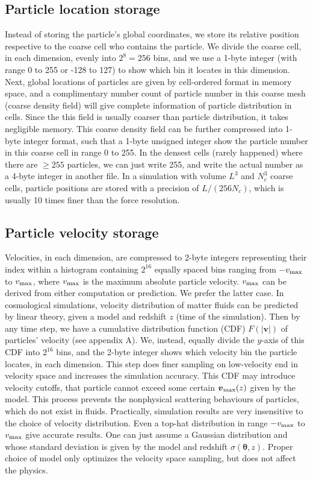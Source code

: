 \documentclass[10pt,twocolumn,preprint]{emulateapj}
\newcommand{\bs}{\boldsymbol}
\begin{document}
\subsection{Particle location storage}
Instead of storing the particle's global coordinates, we store its relative position respective to the coarse cell who contains the particle. We divide the coarse cell, in each dimension, evenly into $2^8=256$ bins, and we use a 1-byte integer (with range 0 to 255 or -128 to 127) to show which bin it locates in this dimension. Next, global locations of particles are given by cell-ordered format in memory space, and a complimentary number count of particle number in this coarse mesh (coarse density field) will give complete information of particle distribution in cells. Since the this field is usually coarser than particle distribution, it takes negligible memory. This coarse density field can be further compressed into 1-byte integer format, such that a 1-byte unsigned integer show the particle number in this coarse cell in range 0 to 255. In the densest cells (rarely happened) where there are $\ge 255$ particles, we can just write 255, and write the actual number as a 4-byte integer in another file. In a simulation with volume $L^3$ and $N_c^3$ coarse cells, particle positions are stored with a precision of $L/(256N_c)$, which is usually 10 times finer than the force resolution.

\subsection{Particle velocity storage}\label{s.velocity}
Velocities, in each dimension, are compressed to 2-byte integers representing their index within a histogram containing $2^{16}$ equally spaced bins ranging from $-v_{\rm max}$ to $v_{\rm max}$, where $v_{\rm max}$ is the maximum absolute particle velocity. $v_{\rm max}$ can be derived from either computation or prediction. We prefer the latter case. In cosmological simulations, velocity distribution of matter fluids can be predicted by linear theory, given a model and redshift $z$ (time of the simulation). Then by any time step, we have a cumulative distribution function (CDF) $F(|\bs{v}|)$ of particles' velocity (see appendix A). We, instead, equally divide the $y$-axis of this CDF into $2^{16}$ bins, and the 2-byte integer shows which velocity bin the particle locates, in each dimension. This step does finer sampling on low-velocity end in velocity space and increases the simulation accuracy. This CDF may introduce velocity cutoffs, that particle cannot exceed some certain $\bs{v}_{\rm max}(z)$ given by the model. This process prevents the nonphysical scattering behaviours of particles, which do not exist in fluids. Practically, simulation results are very insensitive to the choice of velocity distribution. Even a top-hat distribution in range $-v_{\rm max}$ to $v_{\rm max}$ give accurate results. One can just assume a Gaussian distribution and whose standard deviation is given by the model and redshift $\sigma(\bs{\theta},z)$. Proper choice of model only optimizes the velocity space sampling, but does not affect the physics.
\end{document}
